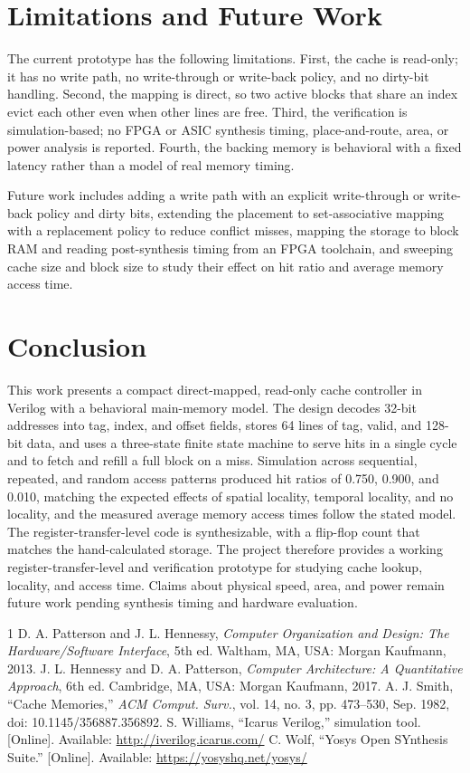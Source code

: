\documentclass[conference]{IEEEtran}
\begin{document}
\section{Limitations and Future Work}
The current prototype has the following limitations. First, the cache is read-only; it has no write path, no write-through or write-back policy, and no dirty-bit handling. Second, the mapping is direct, so two active blocks that share an index evict each other even when other lines are free. Third, the verification is simulation-based; no FPGA or ASIC synthesis timing, place-and-route, area, or power analysis is reported. Fourth, the backing memory is behavioral with a fixed latency rather than a model of real memory timing.

Future work includes adding a write path with an explicit write-through or write-back policy and dirty bits, extending the placement to set-associative mapping with a replacement policy to reduce conflict misses, mapping the storage to block RAM and reading post-synthesis timing from an FPGA toolchain, and sweeping cache size and block size to study their effect on hit ratio and average memory access time.

\section{Conclusion}
This work presents a compact direct-mapped, read-only cache controller in Verilog with a behavioral main-memory model. The design decodes 32-bit addresses into tag, index, and offset fields, stores 64 lines of tag, valid, and 128-bit data, and uses a three-state finite state machine to serve hits in a single cycle and to fetch and refill a full block on a miss. Simulation across sequential, repeated, and random access patterns produced hit ratios of 0.750, 0.900, and 0.010, matching the expected effects of spatial locality, temporal locality, and no locality, and the measured average memory access times follow the stated model. The register-transfer-level code is synthesizable, with a flip-flop count that matches the hand-calculated storage. The project therefore provides a working register-transfer-level and verification prototype for studying cache lookup, locality, and access time. Claims about physical speed, area, and power remain future work pending synthesis timing and hardware evaluation.

\begin{thebibliography}{1}
 D. A. Patterson and J. L. Hennessy, \textit{Computer Organization and Design: The Hardware/Software Interface}, 5th ed. Waltham, MA, USA: Morgan Kaufmann, 2013.
 J. L. Hennessy and D. A. Patterson, \textit{Computer Architecture: A Quantitative Approach}, 6th ed. Cambridge, MA, USA: Morgan Kaufmann, 2017.
 A. J. Smith, ``Cache Memories,'' \textit{ACM Comput. Surv.}, vol. 14, no. 3, pp. 473--530, Sep. 1982, doi: 10.1145/356887.356892.
 S. Williams, ``Icarus Verilog,'' simulation tool. [Online]. Available: \url{http://iverilog.icarus.com/}
 C. Wolf, ``Yosys Open SYnthesis Suite.'' [Online]. Available: \url{https://yosyshq.net/yosys/}
\end{thebibliography}
\end{document}
